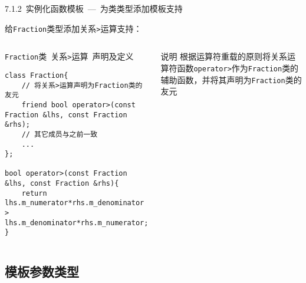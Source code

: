 \begin{frame}[fragile]{7.1.2~实例化函数模板\normalsize{~---~为类类型添加模板支持}}

给\texttt{Fraction}类型添加关系\texttt{>}运算支持：

\vspace{-4mm}

\begin{columns}[t]
\begin{blueblock}{\texttt{Fraction}类~关系\texttt{>}运算~声明及定义}
\begin{lstlisting}[moreemph={Fraction}]
class Fraction{
    // 将关系>运算声明为Fraction类的友元
    friend bool operator>(const Fraction &lhs, const Fraction &rhs);
    // 其它成员与之前一致
    ...
};

bool operator>(const Fraction &lhs, const Fraction &rhs){
    return lhs.m_numerator*rhs.m_denominator > lhs.m_denominator*rhs.m_numerator;
}
\end{lstlisting}
\end{blueblock}
\begin{yellowblock}{说明}
根据运算符重载的原则将关系运算符函数\texttt{operator>}作为\texttt{Fraction}类的辅助函数，并将其声明为\texttt{Fraction}类的友元
\end{yellowblock}
\end{columns}

\end{frame}

\subsection{模板参数类型}

